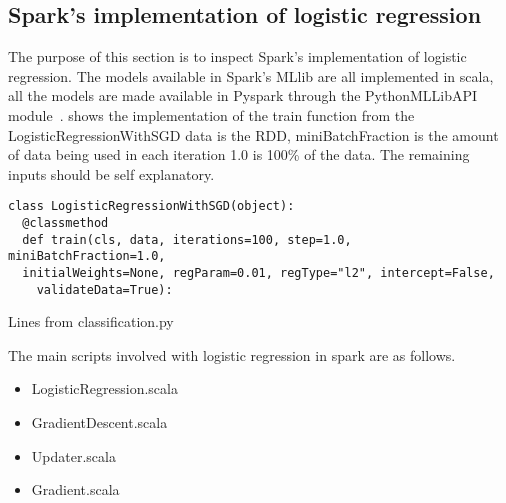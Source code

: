 \subsection{Spark's implementation of logistic regression}\label{sec:sparklogreg}
The purpose of this section is to inspect Spark’s implementation of logistic regression.
The models available in Spark's MLlib are all implemented in scala, all the models are made available in Pyspark through the PythonMLLibAPI module~\cite{hadoopIntro}.
 shows the implementation of the train function from the LogisticRegressionWithSGD data is the RDD, miniBatchFraction is the amount of data being used in each iteration 1.0 is 100\% of the data. The remaining inputs should be self explanatory.   
\begin{listing}[H]
\begin{verbatim}
class LogisticRegressionWithSGD(object):
  @classmethod
  def train(cls, data, iterations=100, step=1.0, miniBatchFraction=1.0,
  initialWeights=None, regParam=0.01, regType="l2", intercept=False,
    validateData=True):
\end{verbatim}
\caption{Lines from classification.py}
\label{lst:py_logreg}
\end{listing}
The main scripts involved with logistic regression in spark are as follows.
\begin{itemize}
\item LogisticRegression.scala
\item GradientDescent.scala
\item Updater.scala
\item Gradient.scala
\end{itemize}

